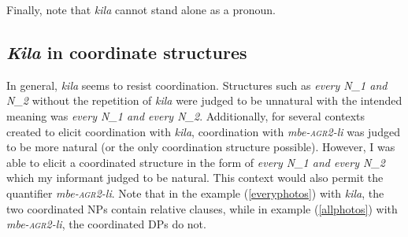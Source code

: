 \documentclass[letterpaper, 12pt]{article}
\begin{document}
Finally, note that \textit{kila} cannot stand alone as a pronoun.

\subsection{\textit{Kila} in coordinate structures}

In general, \textit{kila} seems to resist coordination. Structures such as \textit{every N_{1} and N_{2}} without the repetition of \textit{kila} were judged to be unnatural with the intended meaning was \textit{every N_{1} and every N_{2}}.  Additionally, for several contexts created to elicit coordination with \textit{kila}, coordination with \textit{mbe-\textsc{agr2}-li} was judged to be more natural (or the only coordination structure possible). However, I was able to elicit a coordinated structure in the form of \textit{every N_{1} and every N_{2}} which my informant judged to be natural. This context would also permit the quantifier \textit{mbe-\textsc{agr2}-li}.  Note that in the example (\ref{everyphotos}) with \textit{kila}, the two coordinated NPs contain relative clauses, while in example (\ref{allphotos}) with \textit{mbe-\textsc{agr2}-li}, the coordinated DPs do not.
\end{document}
